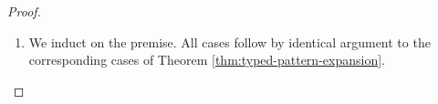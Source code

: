 \begin{proof}
\begin{enumerate}
  \item We induct on the premise. All cases follow by identical argument to the corresponding cases of Theorem \ref{thm:typed-pattern-expansion}.

\end{enumerate}
\end{proof}
